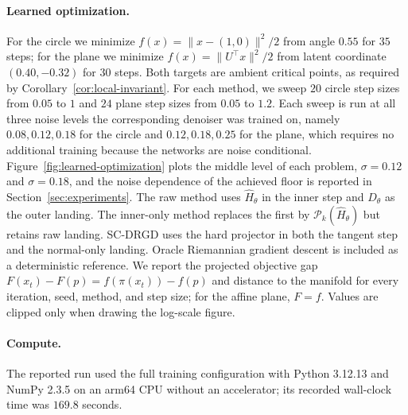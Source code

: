 \paragraph{Learned optimization.}
For the circle we minimize $f(x)=\|x-(1,0)\|^2/2$ from angle $0.55$ for $35$
steps; for the plane we minimize $f(x)=\|U^\top x\|^2/2$ from latent
coordinate $(0.40,-0.32)$ for $30$ steps.  Both targets are ambient critical
points, as required by Corollary~\ref{cor:local-invariant}.  For each method,
we sweep $20$ circle step sizes from $0.05$ to $1$ and $24$ plane step sizes
from $0.05$ to $1.2$.  Each sweep is run at all three noise levels the
corresponding denoiser was trained on, namely $0.08,0.12,0.18$ for the circle and
$0.12,0.18,0.25$ for the plane, which requires no additional training because the
networks are noise conditional.  Figure~\ref{fig:learned-optimization} plots
the middle level of each problem, $\sigma=0.12$ and $\sigma=0.18$, and the
noise dependence of the achieved floor is reported in
Section~\ref{sec:experiments}.
The raw method uses $\widehat H_\theta$ in the inner step and
$D_\theta$ as the outer landing.  The inner-only method replaces the first by
$\mathcal P_k(\widehat H_\theta)$ but retains raw landing.  SC-DRGD uses the
hard projector in both the tangent step and the normal-only landing.  Oracle
Riemannian gradient descent is included as a deterministic reference.  We
report the projected objective gap
$F(x_t)-F(p)=f(\pi(x_t))-f(p)$ and distance to the manifold for every
iteration, seed, method, and step size; for the affine plane, $F=f$.  Values
are clipped only when drawing the log-scale figure.

\paragraph{Compute.}
The reported run used the full training configuration with Python 3.12.13 and
NumPy 2.3.5 on an arm64 CPU without an accelerator; its recorded
wall-clock time was $169.8$ seconds.
